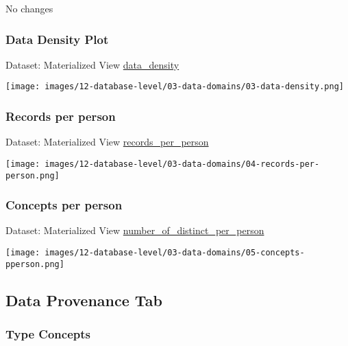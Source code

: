 \documentclass[
]{book}
\begin{document}
No changes

\hypertarget{data-density-plot}{%
\subsubsection*{Data Density Plot}\label{data-density-plot}}

Dataset: Materialized View \href{materialized-views-1.html\#data_density}{data\_density}

\texttt{[image: images/12-database-level/03-data-domains/03-data-density.png]}

\hypertarget{records-per-person}{%
\subsubsection*{Records per person}\label{records-per-person}}

Dataset: Materialized View \href{materialized-views-1.html\#records_per_person}{records\_per\_person}

\texttt{[image: images/12-database-level/03-data-domains/04-records-per-person.png]}

\hypertarget{concepts-per-person}{%
\subsubsection*{Concepts per person}\label{concepts-per-person}}

Dataset: Materialized View \href{materialized-views-1.html\#number_of_distinct_per_person}{number\_of\_distinct\_per\_person}

\texttt{[image: images/12-database-level/03-data-domains/05-concepts-pperson.png]}

\hypertarget{data-provenance-tab-1}{%
\subsection*{Data Provenance Tab}\label{data-provenance-tab-1}}

\hypertarget{type-concepts}{%
\subsubsection*{Type Concepts}\label{type-concepts}}
\end{document}
